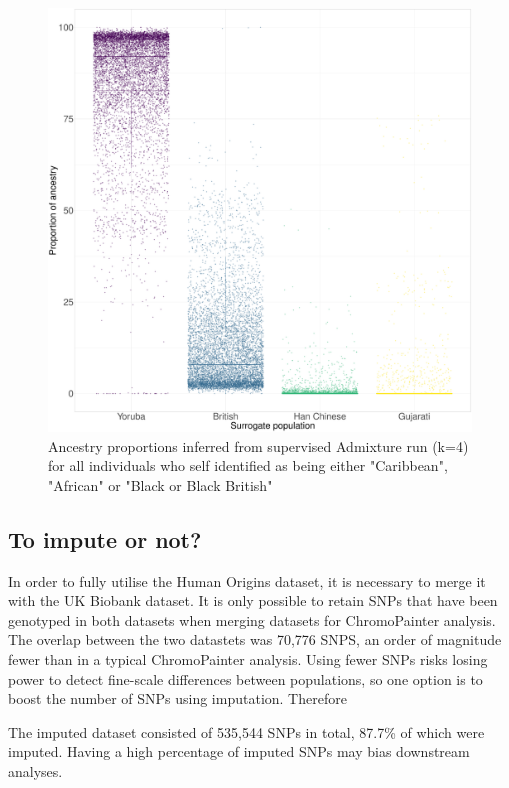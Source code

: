 \begin{figure}[htp]
    \centering
    \includegraphics[width=1.0\textwidth]{../images/chapter3/African_Inds_proportions.pdf}
    \caption{Ancestry proportions inferred from supervised Admixture run (k=4) for all individuals who self identified as being either "Caribbean", "African" or "Black or Black British"}
    \label{fig:African_Inds_proportions_ADMIXTURE}
\end{figure}

\subsection{To impute or not?}


In order to fully utilise the Human Origins dataset, it is necessary to merge it with the UK Biobank dataset. It is only possible to retain SNPs that have been genotyped in both datasets when merging datasets for ChromoPainter analysis. The overlap between the two datastets was 70,776 SNPS, an order of magnitude fewer than in a typical ChromoPainter analysis. Using fewer SNPs risks losing power to detect fine-scale differences between populations, so one option is to boost the number of SNPs using imputation. Therefore

The imputed dataset consisted of 535,544 SNPs in total, 87.7\% of which were imputed. Having a high percentage of imputed SNPs may bias downstream analyses. 

